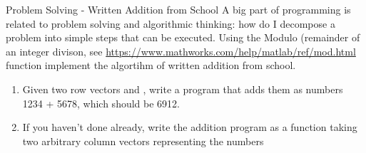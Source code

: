 \begin{task}{Problem Solving - Written Addition from School}{}{}
  A big part of programming is related to problem solving and algorithmic thinking: how do I decompose a problem into simple steps that can be executed. Using the Modulo (remainder of an integer divison, see \url{https://www.mathworks.com/help/matlab/ref/mod.html} function implement the algortihm of written addition from school.

  \begin{enumerate}
  \item{Given two row vectors  and , write a program that adds them as numbers 1234 + 5678, which should be 6912.}
    \item{If you haven't done already, write the addition program as a function taking two arbitrary column vectors representing the numbers}
  \end{enumerate}
%

  
  
\end{task}
